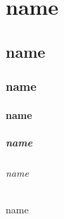 \documentclass[12pt]{article}
\newcommand\"{quote}
\begin{document}


\\

\\[1.5ex]



\part{name}
\chapter{name}
\section{name}
\subsection{name}
\subsubsection{name}
\paragraph{name}
\subparagraph{name}



\label{sec:name}
\end{document}
